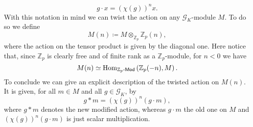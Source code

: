 \begin{ntt}
	\begin{equation*}
		g \cdot x = \left( \chi(g) \right)^n x
	.\end{equation*}
	With this notation in mind we can twist the action on any $\mathscr{G}_K$-module \(M\).
	To do so we define
	\begin{equation*}
		M(n) \coloneqq M \otimes_{\mathbb{Z}_{p}} \mathbb{Z}_{p}(n)
	,\end{equation*}
	where the action on the tensor product is given by the diagonal one.
	Here notice that, since $\mathbb{Z}_{p}$ is clearly free and of finite rank as
	a $\mathbb{Z}_{p}$-module, for $n < 0$ we have
	\begin{equation*}
		M(n) \simeq \operatorname{Hom}_{ \mathbb{Z}_{p}\text{-}\mathsf{Mod} }
		\left( \mathbb{Z}_{p}(-n), M\right)
	.\end{equation*}
	To conclude we can give an explicit description of the twisted action on $M(n)$.
	It is given, for all $m \in M$ and all $g \in \mathscr{G}_K$, by
	\begin{equation*}
		g * m = (\chi(g))^n (g \cdot m)
	,\end{equation*}
	where $g * m$ denotes the new modified action, whereas $g \cdot m$ the old one on $M$
	and $(\chi(g))^n (g \cdot m)$ is just scalar multiplication.
\end{ntt}


